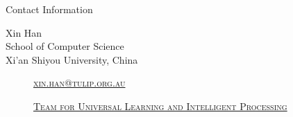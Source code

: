 \documentclass[
 size=14pt,
 paper=smartboard,  %
 mode=present, 		%
 display=slides, 	%
 style=tuliplab,  	%
 pauseslide,
 fleqn,leqno]{powerdot}
\begin{document}
\begin{wideslide}[toc=,bm=]{Contact Information}
\centering
{}
\twocolumn[
lcolwidth=0.35\linewidth,
rcolwidth=0.65\linewidth
]
{
}
{
Xin Han\\
School of Computer Science\\
Xi'an Shiyou University, China

\begin{description}
 \item[\textcolor{orange}{\faEnvelope}] \href{mailto:xin.han@tulip.org.au}
 {\textsc{\footnotesize{xin.han@tulip.org.au}}}

 \item[\textcolor{orange}{\faHome}] \href{http://www.tulip.org.au}
 {\textsc{\footnotesize{Team for Universal Learning and Intelligent Processing}}}
\end{description}
}
\end{wideslide}
\end{document}
